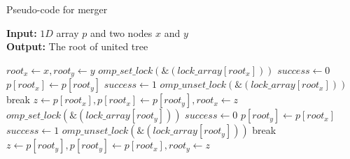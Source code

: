 \begin{algorithm}[ht!]
\small
{
	\caption{Pseudo-code for merger\cite{Patwary2012_PARemSP}}
	\label{alg:merger}
	\textbf{Input:} $1D$ array $p$ and two nodes $x$ and $y$ \\
	\textbf{Output:} The root of united tree 
	\begin{algorithmic}[1]
		\State $root_x \gets x, root_y \gets y$
					\State $omp\_set\_lock(\&(lock\_array[root_x]))$
					\State $success \gets 0$
						\State $p[root_x] \gets p[root_y]$
						\State $success \gets 1$
					\EndIf
					\State $omp\_unset\_lock(\&(lock\_array[root_x]))$
						\State break
					\EndIf
				\EndIf
				\State $z \gets p[root_x], p[root_x] \gets p[root_y], root_x \gets z$
			\Else
					\State $omp\_set\_lock(\&(lock\_array[root_y]))$
					\State $success \gets 0$
						\State $p[root_y] \gets p[root_x]$
						\State $success \gets 1$
					\EndIf
					\State $omp\_unset\_lock(\&(lock\_array[root_y]))$
						\State break
					\EndIf
				\EndIf
				\State $z \gets p[root_y], p[root_y] \gets p[root_x], root_y \gets z$
			\EndIf
		\EndWhile
		\State {}
	\EndFunction
	\end{algorithmic}	
}
\end{algorithm}
